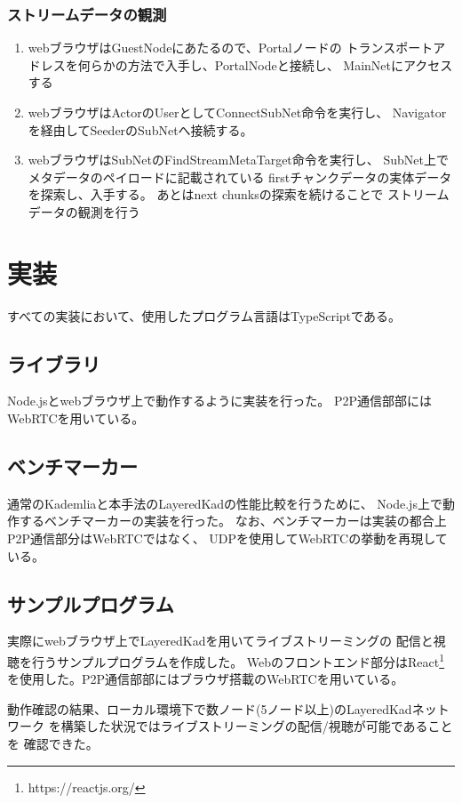 \documentclass[sotsuron]{jcsie}
\begin{document}
\subsubsection{ストリームデータの観測}
\begin{enumerate}
	\item 
	webブラウザはGuestNodeにあたるので、Portalノードの
	トランスポートアドレスを何らかの方法で入手し、PortalNodeと接続し、
	MainNetにアクセスする
	\\
	\item
	webブラウザはActorのUserとしてConnectSubNet命令を実行し、
	Navigatorを経由してSeederのSubNetへ接続する。
	\\
	\item 
	webブラウザはSubNetのFindStreamMetaTarget命令を実行し、
	SubNet上でメタデータのペイロードに記載されている
	firstチャンクデータの実体データを探索し、入手する。
	あとはnext chunksの探索を続けることで
	ストリームデータの観測を行う
\end{enumerate}


\section{実装}
すべての実装において、使用したプログラム言語はTypeScriptである。

\subsection{ライブラリ}
Node.jsとwebブラウザ上で動作するように実装を行った。
P2P通信部部にはWebRTCを用いている。

\subsection{ベンチマーカー}
通常のKademliaと本手法のLayeredKadの性能比較を行うために、
Node.js上で動作するベンチマーカーの実装を行った。
なお、ベンチマーカーは実装の都合上P2P通信部分はWebRTCではなく、
UDPを使用してWebRTCの挙動を再現している。

\subsection{サンプルプログラム}
実際にwebブラウザ上でLayeredKadを用いてライブストリーミングの
配信と視聴を行うサンプルプログラムを作成した。
Webのフロントエンド部分はReact\footnote{https://reactjs.org/}
を使用した。P2P通信部部にはブラウザ搭載のWebRTCを用いている。

動作確認の結果、ローカル環境下で数ノード(5ノード以上)のLayeredKadネットワーク
を構築した状況ではライブストリーミングの配信/視聴が可能であることを
確認できた。
\end{document}
